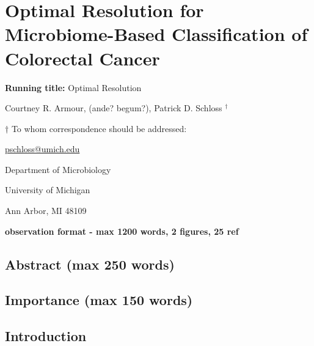\documentclass[
]{article}
\author{}
\date{\vspace{-2.5em}}
\begin{document}
\hypertarget{optimal-resolution-for-microbiome-based-classification-of-colorectal-cancer}{%
\section{Optimal Resolution for Microbiome-Based Classification of
Colorectal
Cancer}\label{optimal-resolution-for-microbiome-based-classification-of-colorectal-cancer}}

\vspace{20mm}

\textbf{Running title:} Optimal Resolution

\vspace{10mm}

Courtney R. Armour, (ande? begum?), Patrick D. Schloss \({^\dagger}\)

\vspace{20mm}

\({\dagger}\) To whom correspondence should be addressed:

\href{mailto:pschloss@umich.edu}{pschloss@umich.edu}

Department of Microbiology

University of Michigan

Ann Arbor, MI 48109

\vspace{20mm}

\textbf{observation format - max 1200 words, 2 figures, 25 ref}

\newpage

\hypertarget{abstract-max-250-words}{%
\subsection{Abstract (max 250 words)}\label{abstract-max-250-words}}

\hypertarget{importance-max-150-words}{%
\subsection{Importance (max 150 words)}\label{importance-max-150-words}}

\newpage

\hypertarget{introduction}{%
\subsection{Introduction}\label{introduction}}
\end{document}
